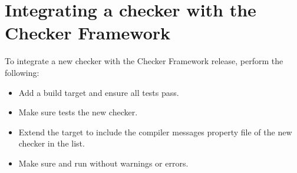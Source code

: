 \section{Integrating a checker with the Checker Framework\label{integrating-a-checker}}


To integrate a new checker with the Checker Framework release, perform
the following:

\begin{itemize}

\item Add a  build target and ensure all tests pass.

\item Make sure  tests the new checker.

\item Extend the  target to include the
compiler messages property file of the new checker in
the  list.

\item Make sure  and  run
without warnings or errors.

\end{itemize}


